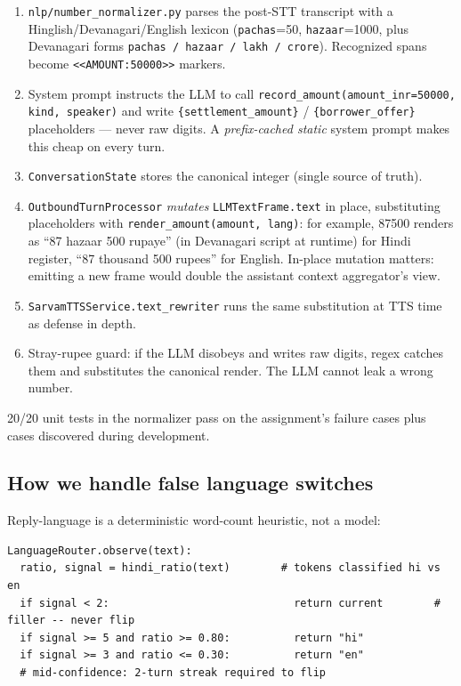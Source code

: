 \documentclass[11pt,a4paper]{article}
\begin{document}
\begin{enumerate}
\item \texttt{nlp/number\_normalizer.py} parses the post-STT transcript with a Hinglish/Devanagari/English lexicon (\texttt{pachas}=50, \texttt{hazaar}=1000, plus Devanagari forms \texttt{pachas / hazaar / lakh / crore}). Recognized spans become \texttt{<<AMOUNT:50000>>} markers.
\item System prompt instructs the LLM to call \texttt{record\_amount(amount\_inr=50000, kind, speaker)} and write \texttt{\{settlement\_amount\}} / \texttt{\{borrower\_offer\}} placeholders --- never raw digits. A \emph{prefix-cached static} system prompt makes this cheap on every turn.
\item \texttt{ConversationState} stores the canonical integer (single source of truth).
\item \texttt{OutboundTurnProcessor} \emph{mutates} \texttt{LLMTextFrame.text} in place, substituting placeholders with \texttt{render\_amount(amount, lang)}: for example, 87500 renders as ``87 hazaar 500 rupaye'' (in Devanagari script at runtime) for Hindi register, ``87 thousand 500 rupees'' for English. In-place mutation matters: emitting a new frame would double the assistant context aggregator's view.
\item \texttt{SarvamTTSService.text\_rewriter} runs the same substitution at TTS time as defense in depth.
\item Stray-rupee guard: if the LLM disobeys and writes raw digits, regex catches them and substitutes the canonical render. The LLM cannot leak a wrong number.
\end{enumerate}

20/20 unit tests in the normalizer pass on the assignment's failure cases plus cases discovered during development.

\subsection*{How we handle false language switches}

Reply-language is a deterministic word-count heuristic, not a model:

\begin{lstlisting}
LanguageRouter.observe(text):
  ratio, signal = hindi_ratio(text)        # tokens classified hi vs en
  if signal < 2:                             return current        # filler -- never flip
  if signal >= 5 and ratio >= 0.80:          return "hi"
  if signal >= 3 and ratio <= 0.30:          return "en"
  # mid-confidence: 2-turn streak required to flip
\end{lstlisting}
\end{document}

